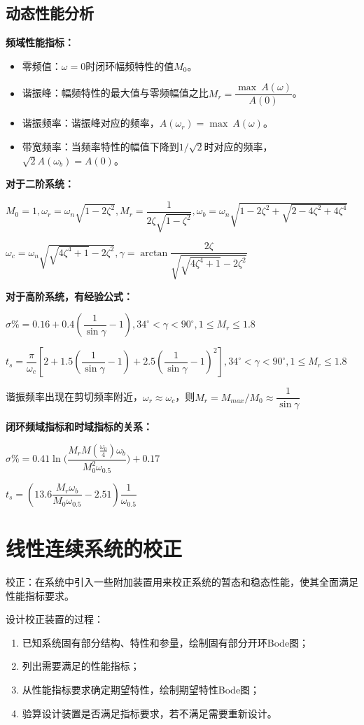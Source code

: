 \documentclass[11pt,a4paper]{ctexart}
\begin{document}
    \subsection{动态性能分析}
        {\setlength{\parindent}{15pt}\textbf{频域性能指标：}}
        \begin{itemize}
            \item 零频值：$\omega=0$时闭环幅频特性的值$M_0$。
            \item 谐振峰：幅频特性的最大值与零频幅值之比$M_r=\dfrac{\max\ A(\omega)}{A(0)}$。
            \item 谐振频率：谐振峰对应的频率，$A(\omega_r)=\max\ A(\omega)$。
            \item 带宽频率：当频率特性的幅值下降到$1/\sqrt2$时对应的频率，$\sqrt2A(\omega_b)=A(0)$。
        \end{itemize}

        \textbf{对于二阶系统：}

        $M_0=1,\omega_r=\omega_n\sqrt{1-2\zeta^2},M_r=\dfrac{1}{2\zeta\sqrt{1-\zeta^2}},\omega_b=\omega_n\sqrt{1-2\zeta^2+\sqrt{2-4\zeta^2+4\zeta^4}}$

        $\omega_c=\omega_n\sqrt{\sqrt{4\zeta^4+1}-2\zeta^2},\gamma=\arctan\dfrac{2\zeta}{\sqrt{\sqrt{4\zeta^4+1}-2\zeta^2}}$

        \textbf{对于高阶系统，有经验公式：}

        $\sigma\%=0.16+0.4(\dfrac{1}{\sin\gamma}-1),34^\circ<\gamma<90^\circ,1\leqslant M_r\leqslant1.8$

        $t_s=\dfrac{\pi}{\omega_c}[2+1.5(\dfrac{1}{\sin\gamma}-1)+2.5(\dfrac{1}{\sin\gamma}-1)^2],34^\circ<\gamma<90^\circ,1\leqslant M_r\leqslant1.8$
        
        谐振频率出现在剪切频率附近，$\omega_r\approx\omega_c$，则$M_r=M_{max}/M_0\approx\dfrac{1}{\sin\gamma}$

        \textbf{闭环频域指标和时域指标的关系：}
        
        $\sigma\%=0.41\ln\bigg(\dfrac{M_rM(\frac{\omega_0}{4})\omega_b}{M_0^2\omega_{0.5}}\bigg)+0.17$

        $t_s=(13.6\dfrac{M_r\omega_b}{M_0\omega_{0.5}}-2.51)\dfrac{1}{\omega_{0.5}}$
\newpage
\section{线性连续系统的校正}
    校正：在系统中引入一些附加装置用来校正系统的暂态和稳态性能，使其全面满足性能指标要求。

    设计校正装置的过程：
    \begin{enumerate}
        \item 已知系统固有部分结构、特性和参量，绘制固有部分开环Bode图；
        \item 列出需要满足的性能指标；
        \item 从性能指标要求确定期望特性，绘制期望特性Bode图；
        \item 验算设计装置是否满足指标要求，若不满足需要重新设计。
    \end{enumerate}
\end{document}
